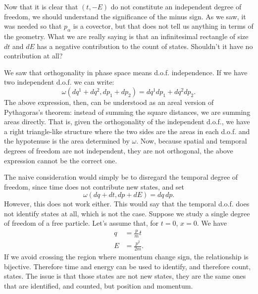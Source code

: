 Now that it is clear that $(t, -E)$ do not constitute an independent degree of freedom, we should understand the significance of the minus sign. As we saw, it was needed so that $p_\alpha$ is a covector, but that does not tell us anything in terms of the geometry. What we are really saying is that an infinitesimal rectangle of size $dt$ and $dE$ has a negative contribution to the count of states. Shouldn't it have no contribution at all?

We saw that orthogonality in phase space means d.o.f. independence. If we have two independent d.o.f. we can write:
\begin{equation}\label{rp-cm-rel-spatialPythagoras}
	\omega(dq^1 + dq^2, dp_1 + dp_2) = dq^1 dp_1 + dq^2 dp_2.
\end{equation}
The above expression, then, can be understood as an areal version of Pythagoras's theorem: instead of summing the square distances, we are summing areas directly. That is, given the orthogonality of the independent d.o.f., we have a right triangle-like structure where the two sides are the areas in each d.o.f. and the hypotenuse is the area determined by $\omega$.  Now, because spatial and temporal degrees of freedom are not independent, they are not orthogonal, the above expression cannot be the correct one.

The naive consideration would simply be to disregard the temporal degree of freedom, since time does not contribute new states, and set
\begin{equation}
	\omega(dq + dt, dp + dE) = dq \, dp.
\end{equation}
However, this does not work either. This would say that the temporal d.o.f. does not identify states at all, which is not the case. Suppose we study a single degree of freedom of a free particle. Let's assume that, for $t=0$, $x=0$. We have
\begin{equation}
	\begin{aligned}
	q &= \frac{p}{m} t \\
	E &= \frac{p^2}{2m}.
	\end{aligned}
\end{equation}
If we avoid crossing the region where momentum change sign, the relationship is bijective. Therefore time and energy can be used to identify, and therefore count, states. The issue is that those states are not new states, they are the same ones that are identified, and counted, but position and momentum.

